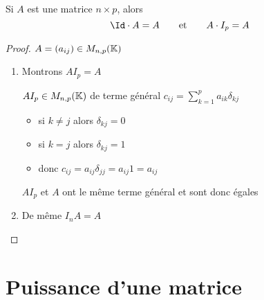 
\begin{frame}

\begin{proposition}
Si $A$ est une matrice $n \times p$, alors 
$$ \Id \cdot A = A \qquad \text{et} \qquad A \cdot I_p = A$$  
\end{proposition}

\pause
\begin{proof} 
$A=(a_{ij}) \in M_{n,p}(\mathbb{K})$

\begin{enumerate}
\item Montrons $AI_p = A$

\pause
$AI_{p}\in M_{n,p}(\mathbb{K})$ de terme général $c_{ij}={\displaystyle \sum_{k=1}^{p}a_{ik}\delta_{kj}}$

\begin{itemize}
\item\pause si $k\neq j$ alors $\delta_{kj}=0$

\item\pause si $k=j$ alors $\delta_{kj}=1$

\item\pause donc $c_{ij}=a_{ij}\delta_{jj}=a_{ij}1=a_{ij}$

\end{itemize}
\pause
$AI_{p}$ et $A$ ont le même terme général et sont donc égales

\item\pause De même $I_{n} A=A$
\vspace{-.2cm}
\end{enumerate}
\end{proof}

\end{frame}

 


\section{Puissance d'une matrice}

